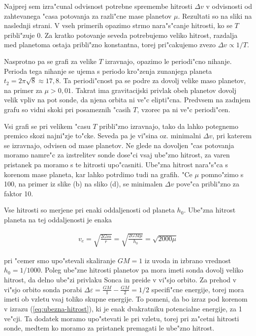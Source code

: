 \documentclass[a4paper,10pt]{article}
\newcommand{\eps}{\varepsilon}
\begin{document}
Najprej sem izra"cunal odvisnost potrebne spremembe hitrosti $\Delta v$ v odvisnosti od zahtevanega "casa potovanja za razli"cne mase planetov $\mu$. Rezultati so na sliki na naslednji strani. V vseh primerih opazimo strmo nara"s"canje hitrosti, ko se $T$ pribli"zuje 0. Za kratko potovanje seveda potrebujemo veliko hitrost, razdalja med planetoma ostaja pribli"zno konstantna, torej pri"cakujemo zvezo $\Delta v \propto 1/T$. 

Nasprotno pa se grafi za velike $T$ izravnajo, opazimo le periodi"cno nihanje. Perioda tega nihanje se ujema s periodo kro"zenja zunanjega planeta $t_2 = 2\pi\sqrt{8} \approx 17,8$. Ta periodi"cnost pa se podre za dovolj velike maso planetov, na primer za $\mu > 0,\!01$. Takrat ima gravitacijski privlak obeh planetov dovolj velik vpliv na pot sonde, da njena orbita ni ve"c elipti"cna. Predvsem na zadnjem grafu so vidni skoki pri posameznih "casih $T$, vzorec pa ni ve"c periodi"cen. 

Vsi grafi se pri velikem "casu $T$ pribli"zno izravnajo, tako da lahko potegnemo premico skozi najni"zje to"cke. Seveda pa je vi"sina oz. minimalni $\Delta v$, pri katerem se izravnajo, odvisen od mase planetov. Ne glede na dovoljen "cas potovanja moramo namre"c za izstrelitev sonde dose"ci vsaj ube"zno hitrost, za varen pristanek pa moramo s te hitrosti upo"casniti. Ube"zna hitrost nara"s"ca s korenom mase planeta, kar lahko potrdimo tudi na grafih. "Ce $\mu$ pomno"zimo s 100, na primer iz slike (b) na sliko (d), se minimalen $\Delta v$ pove"ca pribli"zno za faktor 10. 

Vse hitrosti so merjene pri enaki oddaljenosti od planeta $h_0$. Ube"zna hitrost planeta na tej oddaljenosti je enaka

\begin{align}
\label{eq:ubezna-hitrost}
 v_e = \sqrt{\frac{2Gm}{r}} = \sqrt{\frac{2GM\mu}{h_0}} = \sqrt{2000\mu}
\end{align}

pri "cemer smo upo"stevali skaliranje $GM=1$ iz uvoda in izbrano vrednost $h_0 = 1/1000$. Poleg ube"zne hitrosti planetov pa mora imeti sonda dovolj veliko hitrost, da delno ube"zi privlaku Sonca in preide v vi"sjo orbito. Za prehod v vi"sjo orbito sonda porabi $\Delta \eps = \frac{GM}{1} - \frac{GM}{2} = 1/2$ specifi"cne energije, torej mora imeti ob vzletu vsaj toliko skupne energije. To pomeni, da bo izraz pod korenom v izrazu (\ref{eq:ubezna-hitrost}), ki je enak dvakratniku potencialne energije, za 1 ve"cji. Ta dodatek moramo upo"stevati le pri vzletu, torej pri za"cetni hitrosti sonde, medtem ko moramo za pristanek premagati le ube"zno hitrost. 
\end{document}
